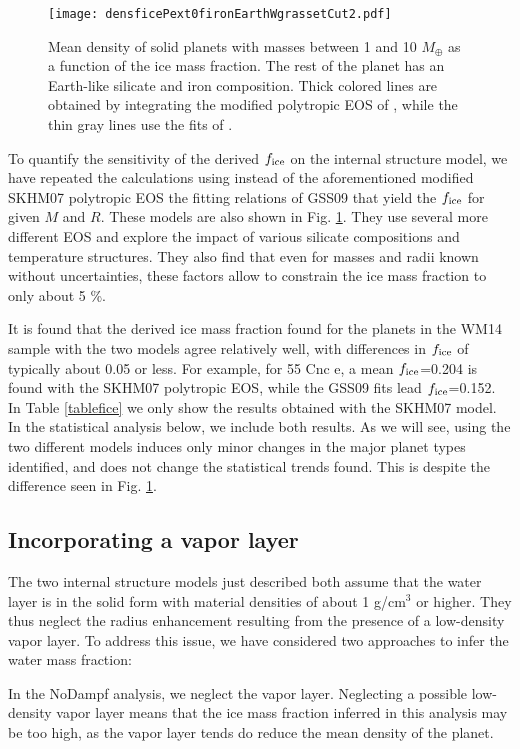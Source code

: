 \documentclass[]{emulateapj}
\def\mearth{M_{\oplus}}
\begin{document}
\begin{figure}
 \texttt{[image: densficePext0fironEarthWgrassetCut2.pdf]}
 \caption{Mean density of solid planets with masses between 1 and 10 $\mearth$ as a function of the ice mass fraction. The rest of the planet has an Earth-like silicate and iron composition. Thick colored lines are obtained by integrating the modified polytropic EOS of \citet{Seager2007}, while the thin gray lines use the fits of  \citet{Grasset2009}. }
  \label{densfice}
\end{figure}

To quantify the sensitivity of the derived $f_{\rm ice}$ on the internal structure model, we have repeated the calculations using instead of the aforementioned modified SKHM07 polytropic EOS the fitting relations of GSS09 that yield the $f_{\rm ice}$ for given $M$ and $R$. These models are also shown in Fig.  \ref{densfice}. They use several more different EOS and explore the impact of various silicate compositions and temperature structures. They also find that even for masses and radii known without uncertainties, these factors allow to constrain the ice mass fraction to only about 5 \%. 

It is found that the derived ice mass fraction found for the planets in the WM14 sample with the two models agree relatively well, with differences in  $f_{\rm ice}$ of typically about 0.05 or less. For example, for 55 Cnc e, a mean $f_{\rm ice}$=0.204 is found with the SKHM07 polytropic EOS, while the GSS09 fits lead $f_{\rm ice}$=0.152. In  Table \ref{tablefice} we only show the results obtained with the SKHM07 model. In the statistical analysis below, we include both results. As we will see, using the two different models induces only minor changes in the major planet types identified, and does not change the statistical trends found. This is despite the  difference seen in Fig. \ref{densfice}. 

\subsection{Incorporating a vapor layer}
The two  internal structure models just described both assume that the water layer is in the solid form with material densities of about 1 g/cm$^3$ or higher. They thus neglect the radius enhancement resulting from the presence of a low-density vapor layer. To address this issue, we have considered two approaches to infer the water mass fraction:

In the NoDampf analysis, we neglect the vapor layer. Neglecting a possible low-density vapor layer means that the  ice mass fraction inferred in this analysis may be too high, as the vapor layer tends do reduce the mean density of the planet.
\end{document}
